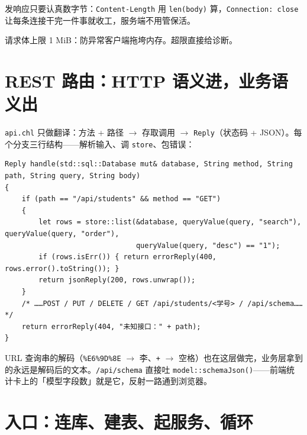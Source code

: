 发响应只要认真数字节：\texttt{Content-Length} 用 \texttt{len(\allowbreak{}body)\allowbreak{}} 算，\texttt{Connection:\allowbreak{} close} 让每条连接干完一件事就收工，服务端不用管保活。

请求体上限 1 MiB：防异常客户端拖垮内存。超限直接给诊断。

\section{REST 路由：HTTP 语义进，业务语义出}

\texttt{api.\allowbreak{}chl} 只做翻译：方法 + 路径 \ensuremath{\rightarrow} 存取调用 \ensuremath{\rightarrow} \texttt{Reply}（状态码 + JSON）。每个分支三行结构——解析输入、调 \texttt{store}、包错误：

\par
\medskip
\begin{lstlisting}[style=chali]
Reply handle(std::sql::Database mut& database, String method, String path, String query, String body)
{
    if (path == "/api/students" && method == "GET")
    {
        let rows = store::list(&database, queryValue(query, "search"), queryValue(query, "order"),
                               queryValue(query, "desc") == "1");
        if (rows.isErr()) { return errorReply(400, rows.error().toString()); }
        return jsonReply(200, rows.unwrap());
    }
    /* ……POST / PUT / DELETE / GET /api/students/<学号> / /api/schema…… */
    return errorReply(404, "未知接口：" + path);
}
\end{lstlisting}
\par
\medskip

URL 查询串的解码（\texttt{\%E6\%9D\%8E} \ensuremath{\rightarrow} 李、\texttt{+} \ensuremath{\rightarrow} 空格）也在这层做完，业务层拿到的永远是解码后的文本。\texttt{/\allowbreak{}api/\allowbreak{}schema} 直接吐 \texttt{model:\allowbreak{}:\allowbreak{}schema\allowbreak{}Json(\allowbreak{})\allowbreak{}}——前端统计卡上的「模型字段数」就是它，反射一路通到浏览器。

\section{入口：连库、建表、起服务、循环}

